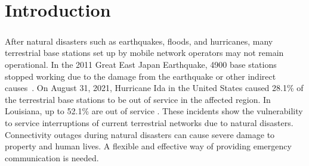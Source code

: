 \documentclass[a4paper,12pt]{report}
\begin{document}
\setcounter{page}{4}
\tableofcontents \newpage
{}
\listoffigures \newpage
{}
\listoftables \newpage
{}
\setcounter{page}{1}

\chapter{Introduction}
\paragraph{}
After natural disasters such as earthquakes, floods, and hurricanes, many terrestrial base stations set up by mobile network operators may not remain operational. In the 2011 Great East Japan Earthquake, 4900 base stations stopped working due to the damage from the earthquake or other indirect causes~\cite{b1}. On August 31, 2021, Hurricane Ida in the United States caused 28.1\% of the terrestrial base stations to be out of service in the affected region. In Louisiana, up to 52.1\% are out of service \cite{b2}. These incidents show the vulnerability to service interruptions of current terrestrial networks due to natural disasters. Connectivity outages during natural disasters can cause severe damage to property and human lives. A flexible and effective way of providing emergency communication is needed.
\end{document}
